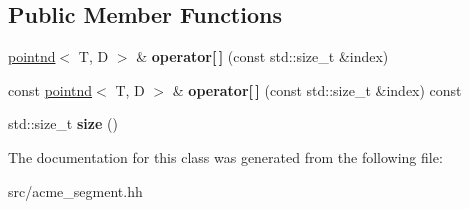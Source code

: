 \subsection*{Public Member Functions}
\begin{DoxyCompactItemize}
\item 
\mbox{\label{classacme_1_1segmentnd_a8635bff51cdc526e812cf1d49f74054b}} 
\hyperlink{classacme_1_1pointnd}{pointnd}$<$ T, D $>$ \& {\bfseries operator\mbox{[}$\,$\mbox{]}} (const std\+::size\+\_\+t \&index)
\item 
\mbox{\label{classacme_1_1segmentnd_a1b40e0a378245df5db64af1e4ec262ab}} 
const \hyperlink{classacme_1_1pointnd}{pointnd}$<$ T, D $>$ \& {\bfseries operator\mbox{[}$\,$\mbox{]}} (const std\+::size\+\_\+t \&index) const
\item 
\mbox{\label{classacme_1_1segmentnd_a844a5fbdb6cb3fc4a8bfcd98039e235e}} 
std\+::size\+\_\+t {\bfseries size} ()
\end{DoxyCompactItemize}


The documentation for this class was generated from the following file\+:\begin{DoxyCompactItemize}
\item 
src/acme\+\_\+segment.\+hh\end{DoxyCompactItemize}
